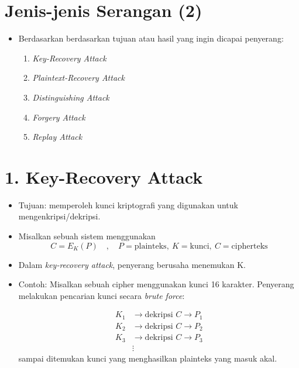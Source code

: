 \documentclass{article}
\begin{document}
\section*{Jenis-jenis Serangan (2)}

\begin{itemize}
    \item Berdasarkan berdasarkan tujuan atau hasil yang ingin dicapai penyerang:
    \begin{enumerate}
        \item \textit{Key-Recovery Attack}
        \item \textit{Plaintext-Recovery Attack}
        \item \textit{Distinguishing Attack}
        \item \textit{Forgery Attack}
        \item \textit{Replay Attack}
    \end{enumerate}
\end{itemize}

\newpage


\section*{1. Key-Recovery Attack}

\begin{itemize}
    \item Tujuan: memperoleh kunci kriptografi yang digunakan untuk mengenkripsi/dekripsi.
    \item Misalkan sebuah sistem menggunakan
    \[ C = E_K(P) \quad , \quad P = \text{plainteks}, \ K = \text{kunci}, \ C = \text{cipherteks} \]
    \item Dalam \textit{key-recovery attack}, penyerang berusaha menemukan K.
    \item Contoh: Misalkan sebuah cipher menggunakan kunci 16 karakter. Penyerang melakukan pencarian kunci secara \textit{brute force}:
    
    \begin{align*}
    K_1 & \to \text{dekripsi } C \to P_1 \\
    K_2 & \to \text{dekripsi } C \to P_2 \\
    K_3 & \to \text{dekripsi } C \to P_3 \\
    & \vdots
    \end{align*}
    sampai ditemukan kunci yang menghasilkan plainteks yang masuk akal.
\end{itemize}
\end{document}
